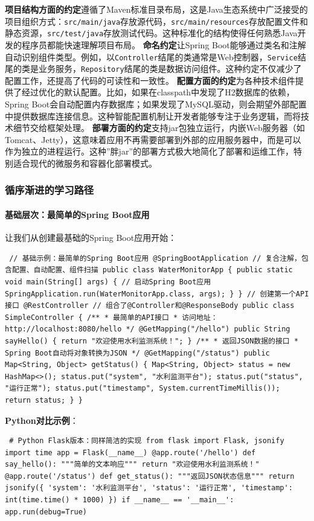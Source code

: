 \textbf{项目结构方面的约定}遵循了Maven标准目录布局，这是Java生态系统中广泛接受的项目组织方式：\texttt{src/main/java}存放源代码，\texttt{src/main/resources}存放配置文件和静态资源，\texttt{src/test/java}存放测试代码。这种标准化的结构使得任何熟悉Java开发的程序员都能快速理解项目布局。 \textbf{命名约定}让Spring Boot能够通过类名和注解自动识别组件类型。例如，以\texttt{Controller}结尾的类通常是Web控制器，\texttt{Service}结尾的类是业务服务，\texttt{Repository}结尾的类是数据访问组件。这种约定不仅减少了配置工作，还提高了代码的可读性和一致性。 \textbf{配置方面的约定}为各种技术组件提供了经过优化的默认配置。比如，如果在classpath中发现了H2数据库的依赖，Spring Boot会自动配置内存数据库；如果发现了MySQL驱动，则会期望外部配置中提供数据库连接信息。这种智能配置机制让开发者能够专注于业务逻辑，而将技术细节交给框架处理。 \textbf{部署方面的约定}支持jar包独立运行，内嵌Web服务器（如Tomcat、Jetty），这意味着应用不再需要部署到外部的应用服务器中，而是可以作为独立的进程运行。这种''胖jar''的部署方式极大地简化了部署和运维工作，特别适合现代的微服务和容器化部署模式。 \subsubsection{循序渐进的学习路径}\label{ux5faaux5e8fux6e10ux8fdbux7684ux5b66ux4e60ux8defux5f84} \paragraph{基础层次：最简单的Spring Boot应用}\label{ux57faux7840ux5c42ux6b21ux6700ux7b80ux5355ux7684spring-bootux5e94ux7528} 让我们从创建最基础的Spring Boot应用开始： \begin{verbatim} // 基础示例：最简单的Spring Boot应用 @SpringBootApplication // 复合注解，包含配置、自动配置、组件扫描 public class WaterMonitorApp { public static void main(String[] args) { // 启动Spring Boot应用 SpringApplication.run(WaterMonitorApp.class, args); } } // 创建第一个API接口 @RestController // 组合了@Controller和@ResponseBody public class SimpleController { /** * 最简单的API接口 * 访问地址：http://localhost:8080/hello */ @GetMapping("/hello") public String sayHello() { return "欢迎使用水利监测系统！"; } /** * 返回JSON数据的接口 * Spring Boot自动将对象转换为JSON */ @GetMapping("/status") public Map<String, Object> getStatus() { Map<String, Object> status = new HashMap<>(); status.put("system", "水利监测平台"); status.put("status", "运行正常"); status.put("timestamp", System.currentTimeMillis()); return status; } } \end{verbatim} \textbf{Python对比示例}： \begin{verbatim} # Python Flask版本：同样简洁的实现 from flask import Flask, jsonify import time app = Flask(__name__) @app.route('/hello') def say_hello(): """简单的文本响应""" return "欢迎使用水利监测系统！" @app.route('/status') def get_status(): """返回JSON状态信息""" return jsonify({ 'system': '水利监测平台', 'status': '运行正常', 'timestamp': int(time.time() * 1000) }) if __name__ == '__main__': app.run(debug=True) \end{verbatim} 